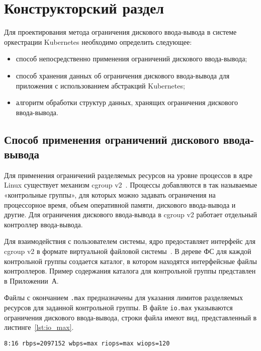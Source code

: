 \chapter{Конструкторский раздел}

Для проектирования метода ограничения дискового ввода-вывода в системе оркестрации Kubernetes необходимо определить следующее:

\begin{itemize}
	\item способ непосредственно применения ограничений дискового ввода-вывода;
	\item способ хранения данных об ограничения дискового ввода-вывода для приложения с использованием абстракций Kubernetes;
	\item алгоритм обработки структур данных, хранящих ограничения дискового ввода-вывода.
\end{itemize}

\section{Способ применения ограничений дискового ввода-вывода}

Для применения ограничений разделяемых ресурсов на уровне процессов в ядре Linux существует механизм cgroup v2~\cite{cgroupv2}. Процессы добавляются в так называемые «контрольные группы», для которых можно задавать ограничения на процессорное время, объем оперативной памяти, дискового ввода-вывода и другие. Для ограничения дискового ввода-вывода в cgroup v2 работает отдельный контроллер ввода-вывода.

Для взаимодействия с пользователем системы, ядро предоставляет интерфейс для cgroup v2 в формате виртуальной файловой системы~\cite{tabatabai2023fbmm}. В дереве ФС для каждой контрольной группы создается каталог, в котором находятся интерфейсные файлы контроллеров. Пример содержания каталога для контрольной группы представлен в Приложении~А.

Файлы с окончанием \texttt{.max} предназначены для указания лимитов разделяемых ресурсов для заданной контрольной группы. В файле \texttt{io.max} указываются ограничения дискового ввода-вывода, строки файла имеют вид, представленный в листинге~\ref{lst:io_max}.

\begin{lstlisting}[label=lst:io_max, caption={Строка файла \texttt{io.max}, в которой описаны ограничения дискового ввода-вывода}]
8:16 rbps=2097152 wbps=max riops=max wiops=120
\end{lstlisting}

